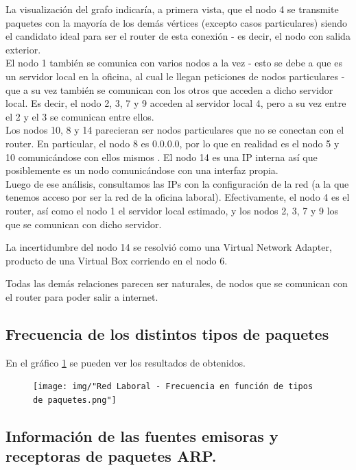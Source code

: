 La visualización del grafo indicaría, a primera vista, que el nodo 4 se transmite paquetes con la mayoría de los demás vértices (excepto casos particulares) siendo el candidato ideal para ser el router de esta conexión - es decir, el nodo con salida exterior.\\

El nodo 1 también se comunica con varios nodos a la vez - esto se debe a que es un servidor local en la oficina, al cual le llegan peticiones de nodos particulares - que a su vez también se comunican con los otros que acceden a dicho servidor local. Es decir, el nodo 2, 3, 7 y 9 acceden al servidor local 4, pero a su vez entre el 2 y el 3 se comunican entre ellos.\\

Los nodos 10, 8 y 14 parecieran ser nodos particulares que no se conectan con el router. En particular, el nodo 8 es 0.0.0.0, por lo que en realidad es el nodo 5 y 10 comunicándose con ellos mismos . El nodo 14 es una IP interna así que posiblemente es un nodo comunicándose con una interfaz propia.\\

Luego de ese análisis, consultamos las IPs con la configuración de la red (a la que tenemos acceso por ser la red de la oficina laboral). Efectivamente, el nodo 4 es el router, así como el nodo 1 el servidor local estimado, y los nodos 2, 3, 7 y 9 los que se comunican con dicho servidor.

La incertidumbre del nodo 14 se resolvió como una Virtual Network Adapter, producto de una Virtual Box corriendo en el nodo 6.

Todas las demás relaciones parecen ser naturales, de nodos que se comunican con el router para poder salir a internet.

\subsection{Frecuencia de los distintos tipos de paquetes}

En el gráfico \ref{laboral:paquetes} se pueden ver los resultados de obtenidos.

\begin{figure}[h!]
    \centering                                                       
    \texttt{[image: img/"Red Laboral - Frecuencia en función de tipos de paquetes.png"]}
    \caption{}
    \label{laboral:paquetes}
\end{figure}

\subsection{Información de las fuentes emisoras y receptoras de paquetes ARP.}

